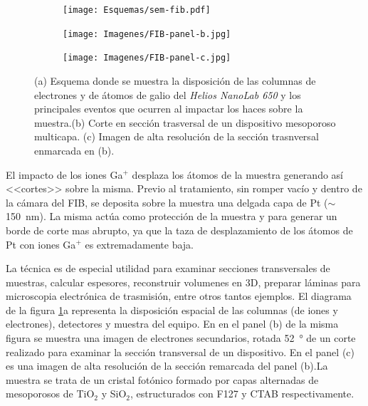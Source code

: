 		\begin{figure}[b!]
			  		  \begin{subfigure}[t]{\textwidth}
			  		  \centering\texttt{[image: Esquemas/sem-fib.pdf]}
			  		  \end{subfigure}
			  		  \begin{subfigure}[t]{0.498\textwidth}
			  		  \texttt{[image: Imagenes/FIB-panel-b.jpg]}
			  		  \end{subfigure}
			  		  \begin{subfigure}[t]{0.498\textwidth}
			  		  \texttt{[image: Imagenes/FIB-panel-c.jpg]}
			  		  \end{subfigure}
			  		  \caption[Esquema de las microscopias FIB/SEM]{(a) Esquema donde se muestra la disposición de las columnas de electrones y de átomos de galio del \textit{Helios NanoLab 650} y los principales eventos que ocurren al impactar los haces sobre la muestra.(b) Corte en sección trasversal de un dispositivo mesoporoso multicapa. (c) Imagen de alta resolución de la sección trasnversal enmarcada en (b).}
			  		  \label{esq:sem-fib}
			  		  \end{figure}

		El impacto de los iones Ga${^+}$ desplaza los átomos de la muestra generando así <<cortes>> sobre la misma. Previo al tratamiento, sin romper vacío y dentro de la cámara del FIB, se deposita sobre la muestra una delgada capa de Pt ($\sim$\SI{150}{\nm}). La misma actúa como protección de la muestra y para generar un borde de corte mas abrupto, ya que la taza de desplazamiento de los átomos de Pt con iones Ga${^+}$ es extremadamente baja.\cite{Giannuzzi2005,Orloff1996} 

			

		La técnica es de especial utilidad para examinar secciones transversales de muestras, calcular espesores, reconstruir volumenes en 3D, preparar láminas para microscopia electrónica de trasmisión, entre otros tantos ejemplos. El diagrama de la figura \ref{esq:sem-fib}a representa la disposición espacial de las columnas (de iones y electrones), detectores y muestra del equipo. En en el panel (b) de la misma figura se muestra una imagen de electrones secundarios, rotada \SI{52}{\degree} de un corte realizado para examinar la sección transversal de un dispositivo. En el panel (c) es una imagen de alta resolución de la sección remarcada del panel (b).La muestra se trata de un cristal fotónico formado por capas alternadas de mesoporosos de TiO$_2$ y SiO$_2$, estructurados con F127 y CTAB respectivamente.\cite{Gimenez2017}

